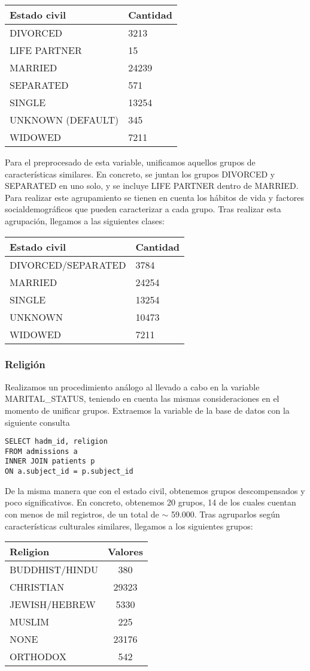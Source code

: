 \documentclass{report}
\begin{document}
\begin{longtable}[]{@{}ll@{}}
\toprule
Estado civil & Cantidad\tabularnewline
\midrule
\endhead
DIVORCED & 3213\tabularnewline
LIFE PARTNER & 15\tabularnewline
MARRIED & 24239\tabularnewline
SEPARATED & 571\tabularnewline
SINGLE & 13254\tabularnewline
UNKNOWN (DEFAULT) & 345\tabularnewline
WIDOWED & 7211\tabularnewline
\bottomrule
\end{longtable}

Para el preprocesado de esta variable, unificamos aquellos grupos de
características similares. En concreto, se juntan los grupos DIVORCED y
SEPARATED en uno solo, y se incluye LIFE PARTNER dentro de MARRIED. Para
realizar este agrupamiento se tienen en cuenta los hábitos de vida y factores socialdemográficos que pueden caracterizar a cada grupo. Tras realizar esta
agrupación, llegamos a las siguientes clases:
\newpage
\begin{longtable}[]{@{}ll@{}}
\toprule
Estado civil & Cantidad\tabularnewline
\midrule
\endhead
DIVORCED/SEPARATED & 3784\tabularnewline
MARRIED & 24254\tabularnewline
SINGLE & 13254\tabularnewline
UNKNOWN & 10473\tabularnewline
WIDOWED & 7211\tabularnewline
\bottomrule
\end{longtable}

\subsubsection{Religión}
Realizamos un procedimiento análogo al llevado a cabo en la variable
MARITAL\_STATUS, teniendo en cuenta las mismas consideraciones en el
momento de unificar grupos. Extraemos la variable de la base de datos
con la siguiente consulta
\begin{verbatim}
SELECT hadm_id, religion 
FROM admissions a
INNER JOIN patients p
ON a.subject_id = p.subject_id
\end{verbatim}
De la misma manera que con el estado civil, obtenemos grupos descompensados y poco significativos. En concreto, obtenemos 20 grupos, 14 de los cuales cuentan con menos de mil registros, de un total de $\sim$ 59.000. Tras agruparlos según características culturales similares, llegamos a los siguientes grupos:
\begin{longtable}[]{@{}lc@{}}
\toprule
Religion & Valores\tabularnewline
\midrule
\endhead
BUDDHIST/HINDU & 380\tabularnewline
CHRISTIAN & 29323\tabularnewline
JEWISH/HEBREW & 5330\tabularnewline
MUSLIM & 225\tabularnewline
NONE & 23176\tabularnewline
ORTHODOX & 542\tabularnewline
\bottomrule
\end{longtable}
\end{document}

